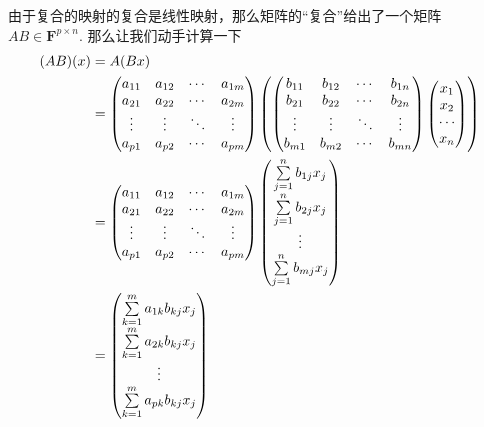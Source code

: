 由于复合的映射的复合是线性映射，那么矩阵的``复合''给出了一个矩阵 $AB\in\mathbf{F}^{p\times n}$. 那么让我们动手计算一下
\begin{align*}
    (AB)(x) &= A(Bx) \\
    &= \begin{pmatrix}
        a_{11} & a_{12} & \cdots & a_{1m} \\
        a_{21} & a_{22} & \cdots & a_{2m} \\
        \vdots & \vdots & \ddots & \vdots \\
        a_{p1} & a_{p2} & \cdots & a_{pm}
    \end{pmatrix} \left( \begin{pmatrix}
        b_{11} & b_{12} & \cdots & b_{1n} \\
        b_{21} & b_{22} & \cdots & b_{2n} \\
        \vdots & \vdots & \ddots & \vdots \\
        b_{m1} & b_{m2} & \cdots & b_{mn}
    \end{pmatrix} \begin{pmatrix}
        x_1 \\ x_2 \\ \cdots \\ x_n
    \end{pmatrix} \right)\\
    &= \begin{pmatrix}
        a_{11} & a_{12} & \cdots & a_{1m} \\
        a_{21} & a_{22} & \cdots & a_{2m} \\
        \vdots & \vdots & \ddots & \vdots \\
        a_{p1} & a_{p2} & \cdots & a_{pm}
    \end{pmatrix} \begin{pmatrix}
        \sum_{j=1}^n\limits b_{1j} x_j \\
        \sum_{j=1}^n\limits b_{2j} x_j \\
        \vdots \\
        \sum_{j=1}^n\limits b_{mj} x_j
    \end{pmatrix} \\
    &= \begin{pmatrix}
        \sum_{k=1}^m\limits a_{1k} b_{kj} x_j \\
        \sum_{k=1}^m\limits a_{2k} b_{kj} x_j \\
        \vdots \\
        \sum_{k=1}^m\limits a_{pk} b_{kj} x_j
    \end{pmatrix} \\

\end{align*}

